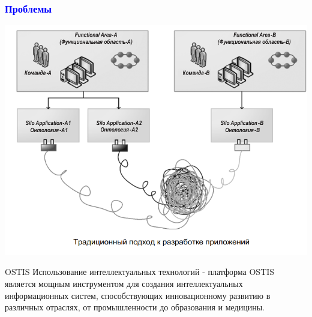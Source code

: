 \documentclass{beamer}
\begin{document}
\begin{frame}
    \frametitle{\textcolor{blue}{Проблемы}}

    \includegraphics[scale=.5]{./images/problems.png}

\end{frame}

\begin{frame}{OSTIS}
    Использование интеллектуальных технологий - платформа OSTIS является мощным инструментом для создания интеллектуальных информационных систем, способствующих инновационному развитию в различных отраслях, от промышленности до образования и медицины.
\end{frame}
\end{document}
